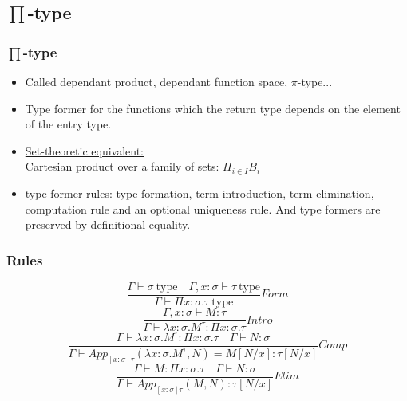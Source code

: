 \documentclass{beamer}
\newcommand{\typ}{\ \mathrm{type}}
\newcommand{\app}[2]{App_{[x:\sigma]\tau}(#1, #2)}
\newcommand{\C}{Comp}
\newcommand{\Intro}{Intro}
\newcommand{\F}{Form}
\newcommand{\E}{Elim}
\begin{document}
    \subsection{$\prod$-type}
    \begin{frame}
        \frametitle{$\prod$-type}
        \begin{itemize}
            \item Called dependant product, dependant function space, $\pi$-type...
            \item Type former for the functions which the return type depends on the element of the entry type.
            \item \underline{Set-theoretic equivalent:}\\
            Cartesian product over a family of sets: $\Pi_{i\in I}B_i$
            \item \underline{type former rules:} type formation, term introduction, term elimination, computation rule and an optional uniqueness rule. And type formers are preserved by definitional equality.
        \end{itemize}
    \end{frame}
    \begin{frame}
        \frametitle{Rules}
        $$\frac{\Gamma \vdash \sigma \typ \quad \Gamma,x:\sigma\vdash \tau \typ}{\Gamma \vdash \Pi x:\sigma.\tau \typ}\F$$
        \vspace{10pt}
        $$\frac{\Gamma, x:\sigma \vdash M : \tau}{\Gamma \vdash \lambda x:\sigma.M^\tau : \Pi x:\sigma.\tau}\Intro$$
        \vspace{10pt}
        $$\frac{\Gamma \vdash \lambda x:\sigma.M^\tau:\Pi x:\sigma.\tau \quad \Gamma \vdash N:\sigma}{\Gamma \vdash \app{\lambda x:\sigma.M^{\tau}}{N} = M[N/x]:\tau[N/x]}\C$$
        \vspace{10pt}
        $$\frac{\Gamma \vdash M : \Pi x: \sigma . \tau \quad \Gamma \vdash N: \sigma}{\Gamma \vdash \app{M}{N}: \tau[N/x]}\E$$
    \end{frame}
\end{document}
